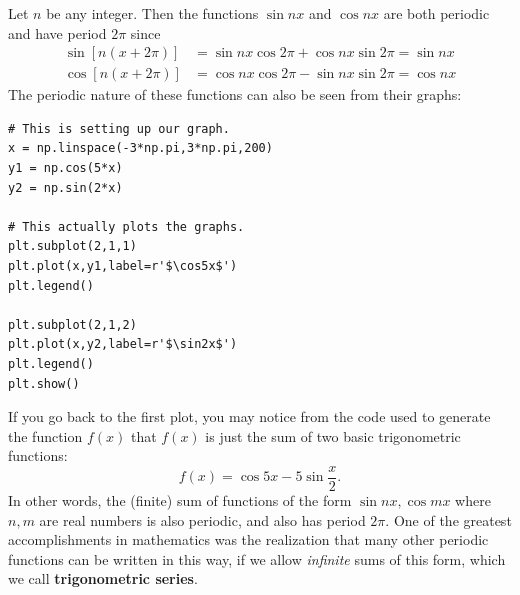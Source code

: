 \documentclass[10pt,]{book}
\newcommand{\terminology}[1]{\textbf{#1}}
\theoremstyle{plain}
\theoremstyle{definition}
\theoremstyle{definition}
\numberwithin{equation}{section}
\begin{document}
                
                Let \(n\) be any integer. Then the functions \(\sin nx\) and \(\cos nx\) are both periodic and have period \(2\pi\) since
                \begin{align*}
\sin[n(x+2\pi)] & = \sin nx\cos2\pi + \cos nx\sin2\pi = \sin nx \\
\cos[n(x+2\pi)] & = \cos nx\cos2\pi - \sin nx\sin2\pi = \cos nx 
\end{align*}
                The periodic nature of these functions can also be seen from their graphs:%

                \begin{lstlisting}[style=sageinput]
# This is setting up our graph.
x = np.linspace(-3*np.pi,3*np.pi,200)
y1 = np.cos(5*x)
y2 = np.sin(2*x)

# This actually plots the graphs.
plt.subplot(2,1,1)
plt.plot(x,y1,label=r'$\cos5x$')
plt.legend()

plt.subplot(2,1,2)
plt.plot(x,y2,label=r'$\sin2x$')
plt.legend()
plt.show()
\end{lstlisting}

            \par
If you go back to the first plot, you may notice from the code used to generate the function \(f(x)\) that \(f(x)\) is just the sum of two basic trigonometric functions:
            \begin{equation*}f(x) = \cos5x-5\sin\frac{x}{2}.\end{equation*}
            In other words, the (finite) sum of functions of the form \(\sin nx,\cos mx\) where \(n,m\) are real numbers is also periodic, and also has period \(2\pi\). One of the greatest accomplishments in mathematics was the realization that many other periodic functions can be written in this way, if we allow \emph{infinite} sums of this form, which we call \terminology{trigonometric series}.%
\typeout{************************************************}
\typeout{************************************************}
\end{document}
